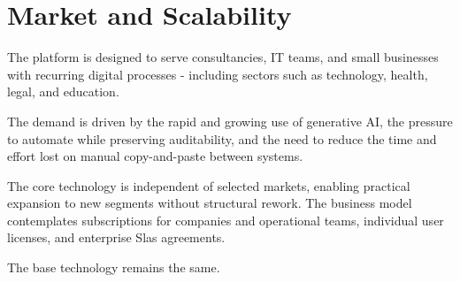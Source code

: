 \section{Market and Scalability}

The platform is designed to serve consultancies, IT teams, and small businesses with recurring digital processes - including sectors such as technology, health, legal, and education.

The demand is driven by the rapid and growing use of generative AI, the pressure to automate while preserving auditability, and the need to reduce the time and effort lost on manual copy-and-paste between systems. 

The core technology is independent of selected markets, enabling practical expansion to new segments without structural rework. The business model contemplates subscriptions for companies and operational teams, individual user licenses, and enterprise Slas agreements.

The base technology remains the same.
